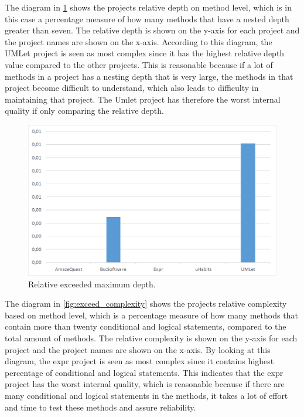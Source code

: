 \documentclass[conference]{IEEEtran}
\begin{document}
The diagram in \cref{fig:exceed_depth} shows the projects relative depth on method level, which is in this case a percentage measure of how many methods that have a nested depth greater than seven. The relative depth is shown on the y-axis for each project and the project names are shown on the x-axis. According to this diagram, the UMLet project is seen as most complex since it   has the highest relative depth value compared to the other projects. This is reasonable because if a lot of methods in a project has a nesting depth that is very large, the methods in that project become difficult to understand, which also leads to difficulty in maintaining that project. The Umlet project has therefore the worst internal quality if only comparing the relative depth. 
\begin{figure}
    \includegraphics[width=\columnwidth]{img/rel_exceeded_depth.png}
\caption{Relative exceeded maximum depth.}
\label{fig:exceed_depth}
\end{figure}


The diagram in \cref{fig:exceed_complexity} shows the projects relative complexity based on method level, which is a percentage measure of how many methods that contain more than twenty conditional and logical statements, compared to the total amount of methods. The relative complexity is shown on the y-axis for each project and the project names are shown on the x-axis. By looking at this diagram, the expr project is seen as most complex since it contains highest percentage of conditional and logical statements.  This indicates that the expr project has the worst internal quality, which is reasonable because if there are many conditional and logical statements in the methods, it takes a lot of effort and time to test these methods and assure reliability. 
\end{document}
